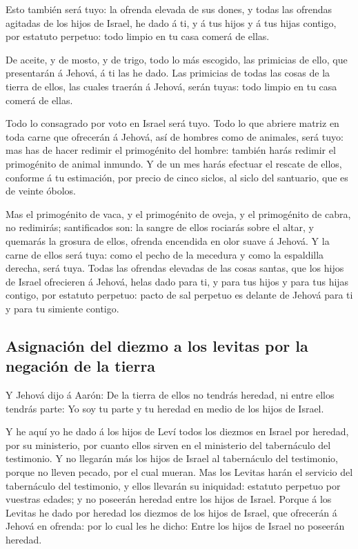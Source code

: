  Esto también será tuyo: la ofrenda elevada de sus dones,
y todas las ofrendas agitadas de los hijos de Israel, he dado á ti, y á
tus hijos y á tus hijas contigo, por estatuto perpetuo: todo limpio en
tu casa comerá de ellas.

 De aceite, y de mosto, y de trigo, todo lo más escogido,
las primicias de ello, que presentarán á Jehová, á ti las he dado.
 Las primicias de todas las cosas de la tierra de ellos,
las cuales traerán á Jehová, serán tuyas: todo limpio en tu casa comerá
de ellas.

 Todo lo consagrado por voto en Israel será tuyo.
 Todo lo que abriere matriz en toda carne que ofrecerán á
Jehová, así de hombres como de animales, será tuyo: mas has de hacer
redimir el primogénito del hombre: también harás redimir el primogénito
de animal inmundo.  Y de un mes harás efectuar el rescate
de ellos, conforme á tu estimación, por precio de cinco siclos, al siclo
del santuario, que es de veinte óbolos.

 Mas el primogénito de vaca, y el primogénito de oveja, y
el primogénito de cabra, no redimirás; santificados son: la sangre de
ellos rociarás sobre el altar, y quemarás la grosura de ellos, ofrenda
encendida en olor suave á Jehová.  Y la carne de ellos
será tuya: como el pecho de la mecedura y como la espaldilla derecha,
será tuya.  Todas las ofrendas elevadas de las cosas
santas, que los hijos de Israel ofrecieren á Jehová, helas dado para ti,
y para tus hijos y para tus hijas contigo, por estatuto perpetuo: pacto
de sal perpetuo es delante de Jehová para ti y para tu simiente contigo.

\hypertarget{asignaciuxf3n-del-diezmo-a-los-levitas-por-la-negaciuxf3n-de-la-tierra}{%
\subsection{Asignación del diezmo a los levitas por la negación de la
tierra}\label{asignaciuxf3n-del-diezmo-a-los-levitas-por-la-negaciuxf3n-de-la-tierra}}

 Y Jehová dijo á Aarón: De la tierra de ellos no tendrás
heredad, ni entre ellos tendrás parte: Yo soy tu parte y tu heredad en
medio de los hijos de Israel.

 Y he aquí yo he dado á los hijos de Leví todos los
diezmos en Israel por heredad, por su ministerio, por cuanto ellos
sirven en el ministerio del tabernáculo del testimonio. 
Y no llegarán más los hijos de Israel al tabernáculo del testimonio,
porque no lleven pecado, por el cual mueran.  Mas los
Levitas harán el servicio del tabernáculo del testimonio, y ellos
llevarán su iniquidad: estatuto perpetuo por vuestras edades; y no
poseerán heredad entre los hijos de Israel.  Porque á los
Levitas he dado por heredad los diezmos de los hijos de Israel, que
ofrecerán á Jehová en ofrenda: por lo cual les he dicho: Entre los hijos
de Israel no poseerán heredad.

